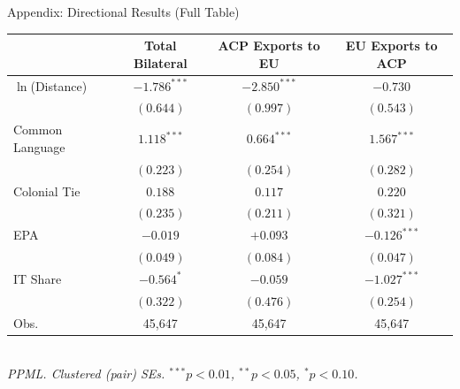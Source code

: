 \documentclass[aspectratio=169,11pt]{beamer}
\begin{document}
\appendix

\begin{frame}{Appendix: Directional Results (Full Table)}
    {\tiny
    \begin{tabular}{lccc}
        \toprule
        & Total Bilateral & ACP Exports to EU & EU Exports to ACP \\
        \midrule
        $\ln$(Distance)  & $-1.786^{***}$ & $-2.850^{***}$ & $-0.730$ \\
                         & $(0.644)$      & $(0.997)$      & $(0.543)$ \\
        Common Language  & $1.118^{***}$  & $0.664^{***}$  & $1.567^{***}$ \\
                         & $(0.223)$      & $(0.254)$      & $(0.282)$ \\
        Colonial Tie     & $0.188$        & $0.117$        & $0.220$ \\
                         & $(0.235)$      & $(0.211)$      & $(0.321)$ \\
        EPA              & $-0.019$       & $+0.093$       & $-0.126^{***}$ \\
                         & $(0.049)$      & $(0.084)$      & $(0.047)$ \\
        IT Share         & $-0.564^{*}$   & $-0.059$       & $-1.027^{***}$ \\
                         & $(0.322)$      & $(0.476)$      & $(0.254)$ \\
        \midrule
        Obs.             & 45,647         & 45,647         & 45,647 \\
        \bottomrule
    \end{tabular}}
    \vspace{0.1cm}\\
    \tiny\textit{PPML. Clustered (pair) SEs. $^{***}p{<}0.01$, $^{**}p{<}0.05$, $^{*}p{<}0.10$.}
\end{frame}
\end{document}
